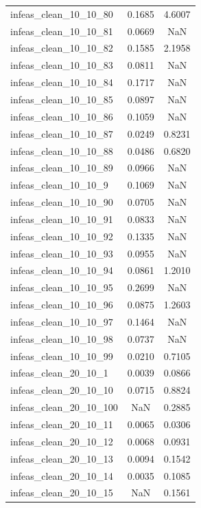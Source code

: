 \begin{longtable}{lcc}
infeas\_clean\_10\_10\_80  &   0.1685 &  4.6007 \\
infeas\_clean\_10\_10\_81  &   0.0669 &     NaN \\
infeas\_clean\_10\_10\_82  &   0.1585 &  2.1958 \\
infeas\_clean\_10\_10\_83  &   0.0811 &     NaN \\
infeas\_clean\_10\_10\_84  &   0.1717 &     NaN \\
infeas\_clean\_10\_10\_85  &   0.0897 &     NaN \\
infeas\_clean\_10\_10\_86  &   0.1059 &     NaN \\
infeas\_clean\_10\_10\_87  &   0.0249 &  0.8231 \\
infeas\_clean\_10\_10\_88  &   0.0486 &  0.6820 \\
infeas\_clean\_10\_10\_89  &   0.0966 &     NaN \\
infeas\_clean\_10\_10\_9   &   0.1069 &     NaN \\
infeas\_clean\_10\_10\_90  &   0.0705 &     NaN \\
infeas\_clean\_10\_10\_91  &   0.0833 &     NaN \\
infeas\_clean\_10\_10\_92  &   0.1335 &     NaN \\
infeas\_clean\_10\_10\_93  &   0.0955 &     NaN \\
infeas\_clean\_10\_10\_94  &   0.0861 &  1.2010 \\
infeas\_clean\_10\_10\_95  &   0.2699 &     NaN \\
infeas\_clean\_10\_10\_96  &   0.0875 &  1.2603 \\
infeas\_clean\_10\_10\_97  &   0.1464 &     NaN \\
infeas\_clean\_10\_10\_98  &   0.0737 &     NaN \\
infeas\_clean\_10\_10\_99  &   0.0210 &  0.7105 \\
infeas\_clean\_20\_10\_1   &   0.0039 &  0.0866 \\
infeas\_clean\_20\_10\_10  &   0.0715 &  0.8824 \\
infeas\_clean\_20\_10\_100 &      NaN &  0.2885 \\
infeas\_clean\_20\_10\_11  &   0.0065 &  0.0306 \\
infeas\_clean\_20\_10\_12  &   0.0068 &  0.0931 \\
infeas\_clean\_20\_10\_13  &   0.0094 &  0.1542 \\
infeas\_clean\_20\_10\_14  &   0.0035 &  0.1085 \\
infeas\_clean\_20\_10\_15  &      NaN &  0.1561 \\

\end{longtable}
